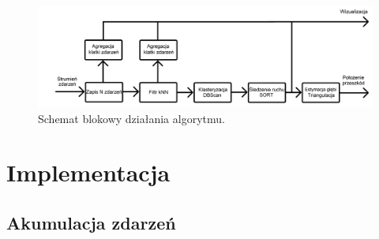 \begin{figure}
    \centering
    \includegraphics[width=1\linewidth]{images/schemat_detekcji.png}
    \caption{Schemat blokowy działania algorytmu.}
    \label{fig:schemat}
\end{figure}

\section{Implementacja}



\subsection{Akumulacja zdarzeń}

